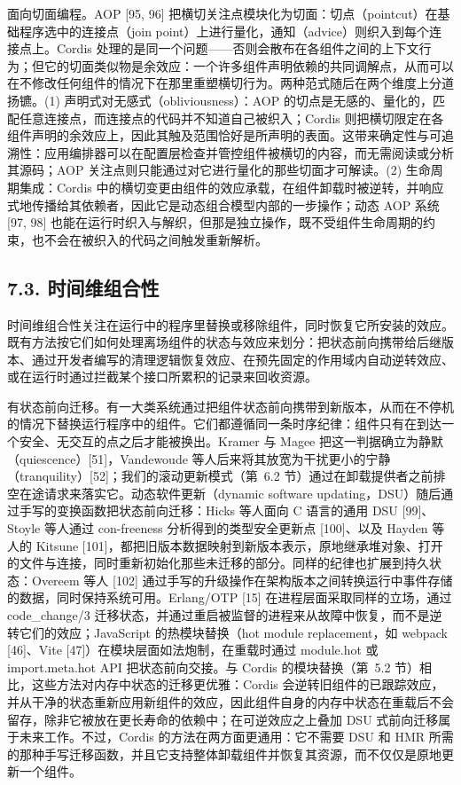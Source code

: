 面向切面编程。AOP {[}95, 96{]} 把横切关注点模块化为切面：切点（pointcut）在基础程序选中的连接点（join point）上进行量化，通知（advice）则织入到每个连接点上。Cordis 处理的是同一个问题——否则会散布在各组件之间的上下文行为；但它的切面类似物是余效应：一个许多组件声明依赖的共同调解点，从而可以在不修改任何组件的情况下在那里重塑横切行为。两种范式随后在两个维度上分道扬镳。(1) 声明式对无感式（obliviousness）：AOP 的切点是无感的、量化的，匹配任意连接点，而连接点的代码并不知道自己被织入；Cordis 则把横切限定在各组件声明的余效应上，因此其触及范围恰好是所声明的表面。这带来确定性与可追溯性：应用编排器可以在配置层检查并管控组件被横切的内容，而无需阅读或分析其源码；AOP 关注点则只能通过对它进行量化的那些切面才可解读。(2) 生命周期集成：Cordis 中的横切变更由组件的效应承载，在组件卸载时被逆转，并响应式地传播给其依赖者，因此它是动态组合模型内部的一步操作；动态 AOP 系统 {[}97, 98{]} 也能在运行时织入与解织，但那是独立操作，既不受组件生命周期的约束，也不会在被织入的代码之间触发重新解析。

\subsection{7.3. 时间维组合性}\label{temporal-composability-1}

时间维组合性关注在运行中的程序里替换或移除组件，同时恢复它所安装的效应。既有方法按它们如何处理离场组件的状态与效应来划分：把状态前向携带给后继版本、通过开发者编写的清理逻辑恢复效应、在预先固定的作用域内自动逆转效应、或在运行时通过拦截某个接口所累积的记录来回收资源。

有状态前向迁移。有一大类系统通过把组件状态前向携带到新版本，从而在不停机的情况下替换运行程序中的组件。它们都遵循同一条时序纪律：组件只有在到达一个安全、无交互的点之后才能被换出。Kramer 与 Magee 把这一判据确立为静默（quiescence）{[}51{]}，Vandewoude 等人后来将其放宽为干扰更小的宁静（tranquility）{[}52{]}；我们的滚动更新模式（第~6.2 节）通过在卸载提供者之前排空在途请求来落实它。动态软件更新（dynamic software updating，DSU）随后通过手写的变换函数把状态前向迁移：Hicks 等人面向 C 语言的通用 DSU {[}99{]}、Stoyle 等人通过 con-freeness 分析得到的类型安全更新点 {[}100{]}、以及 Hayden 等人的 Kitsune {[}101{]}，都把旧版本数据映射到新版本表示，原地继承堆对象、打开的文件与连接，同时重新初始化那些未迁移的部分。同样的纪律也扩展到持久状态：Overeem 等人 {[}102{]} 通过手写的升级操作在架构版本之间转换运行中事件存储的数据，同时保持系统可用。Erlang/OTP {[}15{]} 在进程层面采取同样的立场，通过 code\_change/3 迁移状态，并通过重启被监督的进程来从故障中恢复，而不是逆转它们的效应；JavaScript 的热模块替换（hot module replacement，如 webpack {[}46{]}、Vite {[}47{]}）在模块层面如法炮制，在重载时通过 module.hot 或 import.meta.hot API 把状态前向交接。与 Cordis 的模块替换（第~5.2 节）相比，这些方法对内存中状态的迁移更优雅：Cordis 会逆转旧组件的已跟踪效应，并从干净的状态重新应用新组件的效应，因此组件自身的内存中状态在重载后不会留存，除非它被放在更长寿命的依赖中；在可逆效应之上叠加 DSU 式前向迁移属于未来工作。不过，Cordis 的方法在两方面更通用：它不需要 DSU 和 HMR 所需的那种手写迁移函数，并且它支持整体卸载组件并恢复其资源，而不仅仅是原地更新一个组件。

